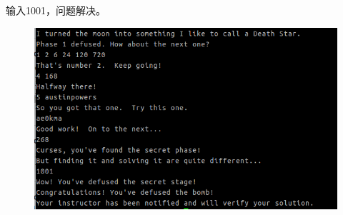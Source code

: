 	\newpage
	
	输入1001，问题解决。
	
	\begin{figure}[h]
		\centering
			\includegraphics[scale=0.77]{images/secret_phase.success.png}
	\end{figure}	